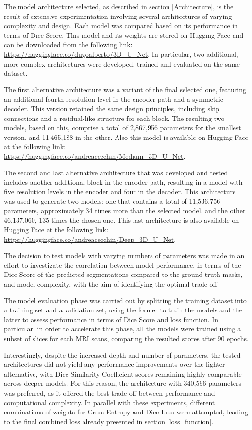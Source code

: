 \documentclass[10pt,twocolumn,letterpaper]{article}
\begin{document}
The model architecture selected, as described in section \ref{Architecture}, is the result of extensive experimentation involving several architectures of varying complexity and design. Each model was compared based on its performance in terms of Dice Score. This model and its weights are stored on Hugging Face and can be downloaded from the following link: \url{https://huggingface.co/dugoalberto/3D_U_Net}.
In particular, two additional, more complex architectures were developed, trained and evaluated on the same dataset.

The first alternative architecture was a variant of the final selected one, featuring an additional fourth resolution level in the encoder path and a symmetric decoder. This version retained the same design principles, including skip connections and a residual-like structure for each block. The resulting two models, based on this, comprise a total of 2,867,956 parameters for the smallest version, and 11,465,188 in the other. Also this model is available on Hugging Face at the following link: \url{https://huggingface.co/andreacecchin/Medium_3D_U_Net}.

The second and last alternative architecture that was developed and tested includes another additional block in the encoder path, resulting in a model with five resolution levels in the encoder and four in the decoder. This architecture was used to generate two models: one that contains a total of 11,536,756 parameters, approximately 34 times more than the selected model, and the other 46,137,060, 135 times the chosen one. This last architecture is also available on Hugging Face at the following link: \url{https://huggingface.co/andreacecchin/Deep_3D_U_Net}.

The decision to test models with varying numbers of parameters was made in an effort to investigate the correlation between model performance, in terms of the Dice Score of the predicted segmentations compared to the ground truth masks, and model complexity, with the aim of identifying the optimal trade-off.

The model evaluation phase was carried out by splitting the training dataset into a training set and a validation set, using the former to train the models and the latter to assess performance in terms of Dice Score and loss function. In particular, in order to accelerate this phase, all the models were trained using a subset of slices for each MRI scans, comparing the resulted scores after 90 epochs.

Interestingly, despite the increased depth and number of parameters, the tested architectures did not yield any performance improvements over the lighter alternative, with Dice Similarity Coefficient scores remaining highly comparable across deeper models.
For this reason, the architecture with 340,596 parameters was preferred, as it offered the best trade-off between performance and computational complexity. In parallel with these experiments, different combinations of weights for Cross-Entropy and Dice Loss were attempted, leading to the final combined loss already presented in section \ref{loss_function}.
\end{document}
